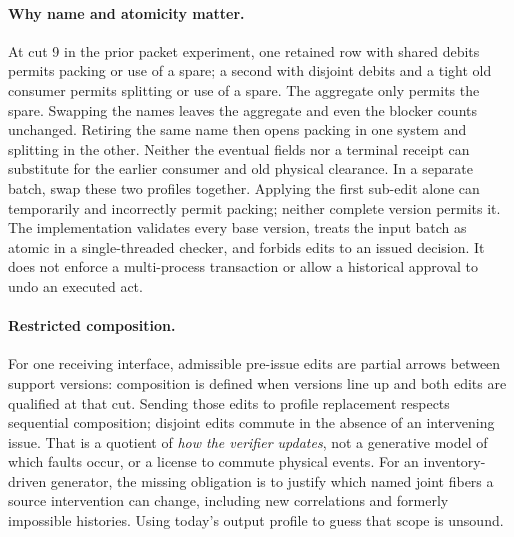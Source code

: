 \documentclass{article}
\begin{document}
\paragraph{Why name and atomicity matter.}
At cut 9 in the prior packet experiment, one retained row with shared debits
permits packing or use of a spare; a second with disjoint debits and a tight old
consumer permits splitting or use of a spare. The aggregate only permits the
spare. Swapping the names leaves the aggregate and even the blocker counts unchanged.
Retiring the same name then opens packing in one system and splitting in the
other. Neither the eventual fields nor a terminal receipt can substitute for
the earlier consumer and old physical clearance. In a separate batch, swap
these two profiles together. Applying the first sub-edit alone can temporarily
and incorrectly permit packing; neither complete version permits it.
The implementation validates every base version, treats the input batch as atomic
in a single-threaded checker, and forbids edits to an issued decision.
It does not enforce a multi-process transaction or allow a historical approval
to undo an executed act.

\paragraph{Restricted composition.}
For one receiving interface, admissible pre-issue edits are partial arrows
between support versions: composition is defined when versions line up
and both edits are qualified at that cut. Sending those edits to profile
replacement respects sequential composition; disjoint edits commute in the
absence of an intervening issue. That is a quotient of \emph{how the verifier
updates}, not a generative model of which faults occur, or a license to
commute physical events. For an inventory-driven generator, the missing
obligation is to justify which named joint fibers a source intervention can
change, including new correlations and formerly impossible histories.
Using today's output profile to guess that scope is unsound.
\end{document}
